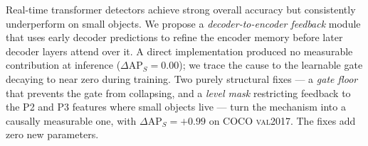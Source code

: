 Real-time transformer detectors achieve strong overall accuracy but consistently underperform on small objects. We propose a \emph{decoder-to-encoder feedback} module that uses early decoder predictions to refine the encoder memory before later decoder layers attend over it. A direct implementation produced no measurable contribution at inference ($\Delta\mathrm{AP}_S = 0.00$); we trace the cause to the learnable gate decaying to near zero during training. Two purely structural fixes --- a \emph{gate floor} that prevents the gate from collapsing, and a \emph{level mask} restricting feedback to the P2 and P3 features where small objects live --- turn the mechanism into a causally measurable one, with $\Delta\mathrm{AP}_S = +0.99$ on COCO \textsc{val2017}. The fixes add zero new parameters.
